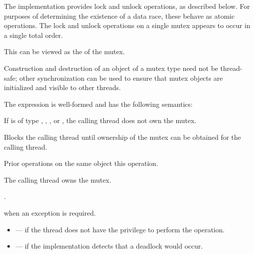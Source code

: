 \pnum
The implementation provides lock and unlock operations, as described below.
For purposes of determining the existence of a data race, these behave as
atomic operations. The lock and unlock operations on
a single mutex appears to occur in a single total order.
\begin{note}
This
can be viewed as the  of the
mutex.
\end{note}
\begin{note}
Construction and
destruction of an object of a mutex type need not be thread-safe; other
synchronization can be used to ensure that mutex objects are initialized
and visible to other threads.
\end{note}

\pnum
The expression  is well-formed and has the following semantics:
\begin{itemdescr}
\pnum
\expects
If  is of type , ,
, or , the calling
thread does not own the mutex.

\pnum
{}%
\effects
Blocks the calling thread until ownership of the mutex can be obtained for the calling thread.

\pnum
\sync
Prior  operations on the same object
 this operation.

\pnum
\ensures
The calling thread owns the mutex.

\pnum
\returntype {}.

\pnum
\throws
{} when
an exception is required.

\pnum
\errors
\begin{itemize}
\item {} --- if the thread does not have the
privilege to perform the operation.

\item {} --- if the implementation detects
that a deadlock would occur.
\end{itemize}
\end{itemdescr}

